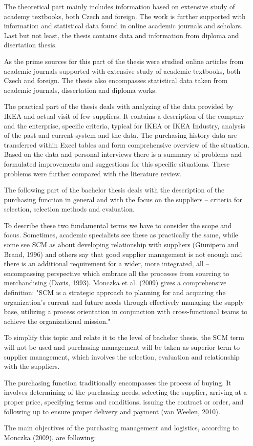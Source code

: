 \documentclass[oneside,12pt]{article}%
\begin{document}
The theoretical part mainly includes information based on extensive study of academy textbooks, both Czech and foreign. The work is further supported with information and statistical data found in online academic journals and scholars. Last but not least, the thesis contains data and information from diploma and disertation thesis. \par
As the prime sources for this part of the thesis were studied online articles from academic journals supported with extensive study of academic textbooks, both Czech and foreign. The thesis also encompasses statistical data taken from academic journals, dissertation and diploma works. \par
The practical part of the thesis deals with analyzing of the data provided by IKEA and actual visit of few suppliers. It contains a description of the company and the enterprise, specific criteria, typical for IKEA or IKEA Industry, analysis of the past and current system and the data. The purchasing history data are transferred within Excel tables and form comprehensive overview of the situation. Based on the data and personal interviews there is a summary of problems and formulated improvements and suggestions for this specific situations. These problems were further compared with the literature review.

The following part of the bachelor thesis deals with the description of the purchasing function in general and with the focus on the suppliers – criteria for selection, selection methods and evaluation.

To describe these two fundamental terms we have to consider the scope and focus. Sometimes, academic specialists see these as practically the same, while some see SCM as about developing relationship with suppliers (Giunipero and Brand, 1996) and others say that good supplier management is not enough and there is an additional requirement for a wider, more integrated, all – encompassing perspective which embrace all the processes from sourcing to merchandising (Davis, 1993). Monczka et al. (2009) gives a comprehensive definition: "SCM is a strategic approach to planning for and acquiring the organization’s current and future needs through effectively managing the supply base, utilizing a process orientation in conjunction with cross-functional teams to achieve the organizational mission." \par
To simplify this topic and relate it to the level of bachelor thesis, the SCM term will not be used and purchasing management will be taken as superior term to supplier management, which involves the selection, evaluation and relationship with the suppliers.\par
The purchasing function traditionally encompasses the process of buying. It involves determining of the purchasing needs, selecting the supplier, arriving at a proper price, specifying terms and conditions, issuing the contract or order, and following up to ensure proper delivery and payment (van Weelen, 2010). \par
The main objectives of the purchasing management and logistics, according to Monczka (2009), are following:
\end{document}
